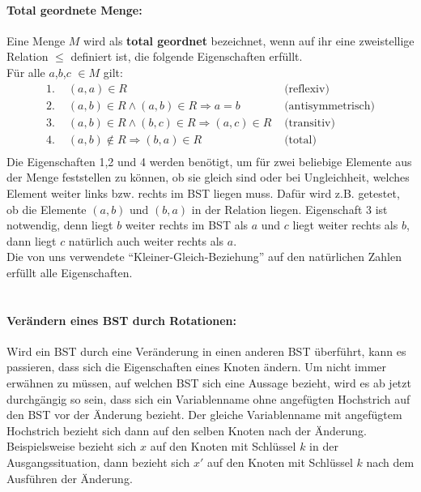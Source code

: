 \documentclass[a4paper,12pt]{article}
\begin{document}
\paragraph{Total geordnete Menge:} 
Eine Menge $M$ wird als \textbf{total geordnet} bezeichnet, wenn auf ihr eine zweistellige Relation $\leq$ definiert ist, die folgende Eigenschaften erfüllt.\\
Für alle $a$,$b$,$c$ $\in M$ gilt:
\begin{align*}
\text{1. } & (a,a) \in R  &\text{  (reflexiv)}\\
\text{2. } & (a,b) \in R  \land  (a,b) \in R \Rightarrow a = b  &\text{  (antisymmetrisch)}\\
\text{3. } & (a,b) \in R  \land  (b,c) \in R \Rightarrow  (a,c) \in R  &\text{  (transitiv)}\\
\text{4. } & (a,b) \notin R \Rightarrow  (b,a) \in R   &\text{  (total)}\\
\end{align*}
Die Eigenschaften 1,2 und 4 werden benötigt, um für zwei beliebige Elemente aus der Menge feststellen zu können, ob sie gleich sind oder bei Ungleichheit, welches Element weiter links bzw. rechts im BST liegen muss. Dafür wird z.B. getestet, ob die Elemente $(a,b)$ und $(b, a)$ in der Relation liegen. Eigenschaft 3 ist notwendig, denn liegt $b$ weiter rechts im BST als $a$ und $c$ liegt weiter rechts als $b$, dann liegt $c$ natürlich auch weiter rechts als $a$. \\
Die von uns verwendete \enquote{Kleiner-Gleich-Beziehung} auf den natürlichen Zahlen erfüllt alle Eigenschaften.
\\
\\




\paragraph{Verändern eines BST durch Rotationen:}
Wird ein BST durch eine Veränderung in einen anderen BST überführt, kann es passieren, dass sich die Eigenschaften eines Knoten ändern. Um nicht immer erwähnen zu müssen, auf welchen BST sich eine Aussage bezieht, wird es ab jetzt durchgängig so sein, dass sich ein Variablenname ohne angefügten Hochstrich auf den BST vor der Änderung bezieht. Der gleiche Variablenname mit angefügtem Hochstrich bezieht sich dann auf den selben Knoten nach der Änderung. Beispielsweise bezieht sich $x$ auf den Knoten mit Schlüssel $k$ in der Ausgangssituation, dann bezieht sich $x'$ auf den Knoten mit Schlüssel $k$ nach dem Ausführen der Änderung. \\
\end{document}
